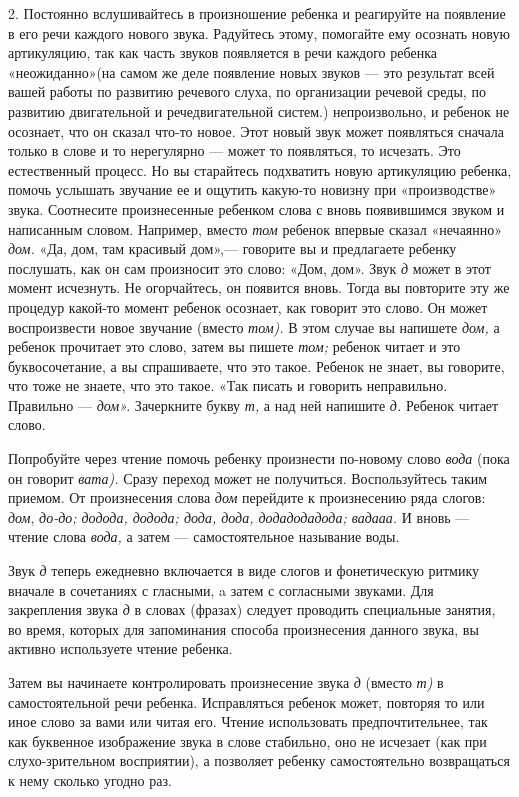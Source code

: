 \documentclass{book}
\renewcommand{\emph}[1]{\textit{#1}}
\begin{document}
2. Постоянно вслушивайтесь в произношение ребенка и реагируйте на
появление в его речи каждого нового звука. Радуйтесь этому, помогайте
ему осознать новую артикуляцию, так как часть звуков появляется в речи
каждого ребенка «неожиданно»(на самом же деле появление новых звуков ---
это результат всей вашей работы по развитию речевого слуха, по
организации речевой среды, по развитию двигательной и речедвигательной
систем.) непроизвольно, и ребенок не осознает, что он сказал что-то
новое. Этот новый звук может появляться сначала только в слове и то
нерегулярно --- может то появляться, то исчезать. Это естественный
процесс. Но вы старайтесь подхватить новую артикуляцию ребенка, помочь
услышать звучание ее и ощутить какую-то новизну при «производстве»
звука. Соотнесите произнесенные ребенком слова с вновь появившимся
звуком и написанным словом. Например, вместо \emph{том} ребенок впервые
сказал «нечаянно» \emph{дом.} «Да, дом, там красивый дом»,--- говорите
вы и предлагаете ребенку послушать, как он сам произносит это слово:
«Дом, дом». Звук \emph{д} может в этот момент исчезнуть. Не огорчайтесь,
он появится вновь. Тогда вы повторите эту же процедур какой-то момент
ребенок осознает, как говорит это слово. Он может воспроизвести новое
звучание (вместо \emph{том).} В этом случае вы напишете \emph{дом,} а
ребенок прочитает это слово, затем вы пишете \emph{том;} ребенок читает
и это буквосочетание, а вы спрашиваете, что это такое. Ребенок не знает,
вы говорите, что тоже не знаете, что это такое. «Так писать и говорить
неправильно. Правильно --- \emph{дом».} Зачеркните букву \emph{т,} а над
ней напишите \emph{д.} Ребенок читает слово.

Попробуйте через чтение помочь ребенку произнести по-новому слово
\emph{вода} (пока он говорит \emph{вата).} Сразу переход может не
получиться. Воспользуйтесь таким приемом. От произнесения слова
\emph{дом} перейдите к произнесению ряда слогов: \emph{дом},
\emph{до-до; додода, додода; дода, дода, додадодадода; вадааа.} И вновь
--- чтение слова \emph{вода,} а затем --- самостоятельное называние
воды.

Звук \emph{д} теперь ежедневно включается в виде слогов и фонетическую
ритмику вначале в сочетаниях с гласными, a затем с согласными звуками.
Для закрепления звука \emph{д} в словах (фразах) следует проводить
специальные занятия, во время, которых для запоминания способа
произнесения данного звука, вы активно используете чтение ребенка.

Затем вы начинаете контролировать произнесение звука \emph{д} (вместо
\emph{т)} в самостоятельной речи ребенка. Исправляться ребенок может,
повторяя то или иное слово за вами или читая его. Чтение использовать
предпочтительнее, так как буквенное изображение звука в слове стабильно,
оно не исчезает (как при слухо-зрительном восприятии), а позволяет
ребенку самостоятельно возвращаться к нему сколько угодно раз.
\end{document}
